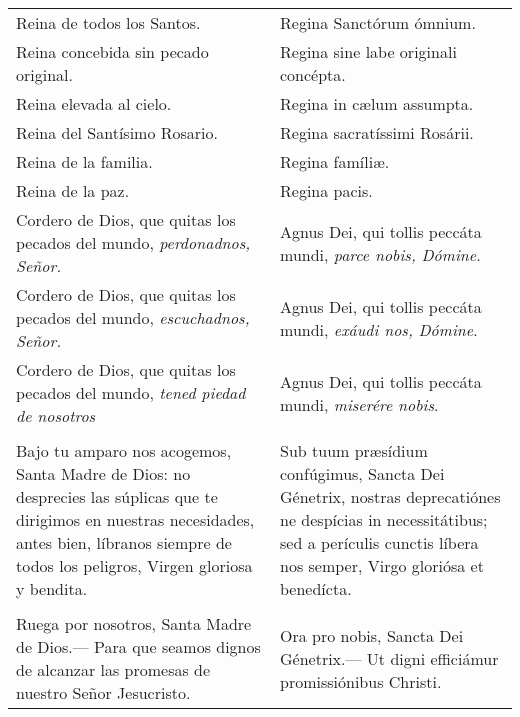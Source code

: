 \documentclass[./devocionario.tex]{subfiles}
\begin{document}
\begin{longtable} { p{} p{} }
        Reina de todos los Santos. & Regina Sanctórum ómnium.\\
        Reina concebida sin pecado original. & Regina sine labe originali concépta.\\
        Reina elevada al cielo. & Regina in cælum assumpta.\\
        Reina del Santísimo Rosario. & Regina sa­cra­tíssimi Rosárii.\\
        Reina de la familia. & Regina famíliæ.\\
        Reina de la paz. & Regina pacis.\\
        Cordero de Dios, que quitas los pecados del mundo, \emph{perdonadnos, Señor.} &
        Agnus Dei, qui tollis peccáta mundi, \emph{parce nobis, Dómine}.\\
        Cordero de Dios, que quitas los pecados del mundo, \emph{escuchadnos, Señor.} &
        Agnus Dei, qui tollis peccáta mundi, \emph{exáudi nos, Dómine}.\\
        Cordero de Dios, que quitas los pecados del mundo, \emph{tened piedad de nosotros} &
        Agnus Dei, qui tollis peccáta mundi, \emph{miserére nobis}.\\\\
        Bajo tu amparo nos acogemos, Santa Madre de Dios: no desprecies las súplicas que te dirigimos en nuestras necesidades, 
        antes bien, líbranos siempre de todos los peligros, Virgen gloriosa y bendita. &
        Sub tuum præsídium confúgimus, Sancta Dei Génetrix, nostras de­pre­ca­tiónes ne despícias in ne­ces­si­tátibus; 
        sed a perículis cunctis líbera nos semper, Virgo gloriósa et benedícta.\\\\
        Ruega por nosotros, Santa Madre de Dios.--- Para que seamos dignos de alcanzar las promesas de nuestro Señor Jesucristo. &
        Ora pro nobis, Sancta Dei Génetrix.--- Ut digni efficiámur pro­mi­ssiónibus Christi.
        
    \end{longtable}
\end{document}
